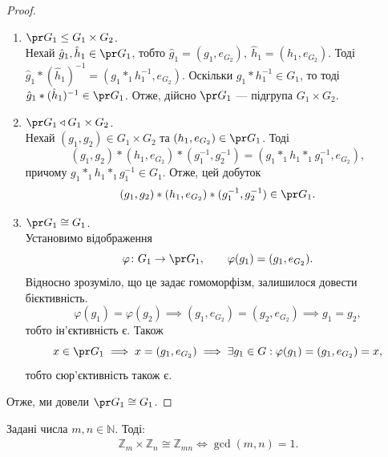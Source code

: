 \documentclass{math_library}
\begin{document}
\begin{proof}
\begin{enumerate}[wide=0pt,topsep=0pt,label={\Roman*.}]
\item $\pr G_1 \leq G_1 \times G_2$.\\
Нехай $\hat{g}_1, \hat{h}_1 \in \pr G_1$, тобто $\hat{g}_1 = (g_1, e_{G_2}),\ \hat{h}_1 = (h_1, e_{G_2})$. Тоді $\hat{g}_1 * (\hat{h}_1)^{-1} = (g_1 *_1 h_1^{-1}, e_{G_2})$. Оскільки $g_1 * h_1^{-1} \in G_1$, то тоді $\hat{g}_1 * (\hat{h}_1)^{-1} \in \pr G_1$. Отже, дійсно $\pr G_1$ --- підгрупа $G_1 \times G_2$.

\item $\pr G_1 \triangleleft G_1 \times G_2$.\\
Нехай $(g_1,g_2) \in G_1 \times G_2$ та $(h_1,e_{G_2}) \in \pr G_1$. Тоді 
\[
(g_1,g_2)*(h_1,e_{G_2})*(g_1^{-1},g_2^{-1}) = (g_1*_1 h_1 *_1 g_1^{-1}, e_{G_2}),
\] 
причому $g_1*_1 h_1 *_1 g_1^{-1} \in G_1$. Отже, цей добуток 
\[
(g_1,g_2)*(h_1,e_{G_2})*(g_1^{-1},g_2^{-1}) \in \pr G_1.
\]

\item $\pr G_1 \cong G_1$.\\
Установимо відображення 
\[ 
\varphi \colon G_1 \to \pr G_1, \qquad \varphi(g_1) = (g_1,e_{G_2}).
\] Відносно зрозуміло, що це задає гомоморфізм, залишилося довести бієктивність.
\[
\varphi(g_1) = \varphi(g_2) \implies (g_1,e_{G_2}) = (g_2,e_{G_2}) \implies g_1 = g_2,
\]
тобто ін'єктивність є. Також
\[
x \in \pr G_1 \implies x = (g_1,e_{G_2}) \implies \exists g_1 \in G: \varphi(g_1) = (g_1,e_{G_2}) = x,
\]
тобто сюр'єктивність також є.
\end{enumerate}
Отже, ми довели $\pr G_1 \cong G_1$.
\end{proof}

\begin{theorem}
Задані числа $m,n \in \mathbb{N}$. Тоді:
\begin{align*}
\mathbb{Z}_m \times \mathbb{Z}_n \cong \mathbb{Z}_{mn} \iff \gcd(m,n) = 1.
\end{align*}
\end{theorem}
\end{document}
